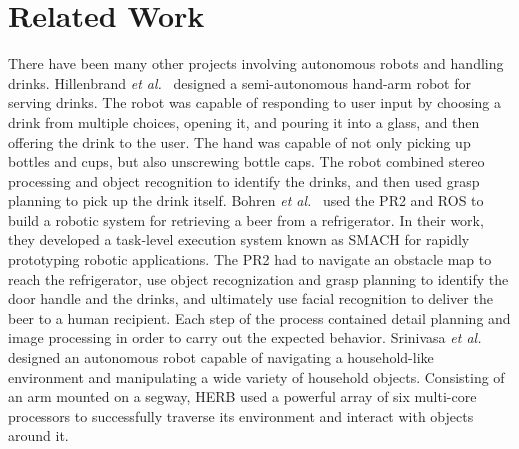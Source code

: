 \documentclass{sig-alternate}
\begin{document}
\section{Related Work}
\label{sec:related_work}
There have been many other projects involving autonomous robots and handling drinks. Hillenbrand \textit{et al.}~\cite{pouring_arm} designed a semi-autonomous hand-arm robot for serving drinks. The robot was capable of responding to user input by choosing a drink from multiple choices, opening it, and pouring it into a glass, and then offering the drink to the user. The hand was capable of not only picking up bottles and cups, but also unscrewing bottle caps. The robot combined stereo processing and object recognition to identify the drinks, and then used grasp planning to pick up the drink itself. Bohren \textit{et al.}~\cite{beer} used the PR2 and ROS to build a robotic system for retrieving a beer from a refrigerator. In their work, they developed a task-level execution system known as SMACH for rapidly prototyping robotic applications. The PR2 had to navigate an obstacle map to reach the refrigerator, use object recognization and grasp planning to identify the door handle and the drinks, and ultimately use facial recognition to deliver the beer to a human recipient. Each step of the process contained detail planning and image processing in order to carry out the expected behavior. Srinivasa \textit{et al.}~\cite{herb} designed an autonomous robot capable of navigating a household-like environment and manipulating a wide variety of household objects. Consisting of an arm mounted on a segway, HERB used a powerful array of six multi-core processors to successfully traverse its environment and interact with objects around it.
\end{document}
